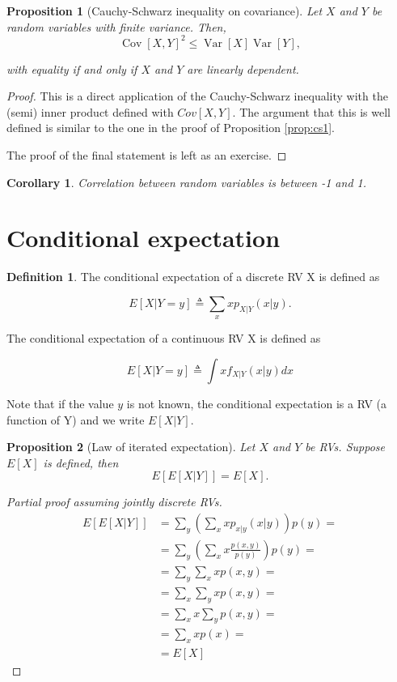 \documentclass{book}
\theoremstyle{plain}%
\newtheorem{corollary}{Corollary}[section]
\newtheorem{proposition}{Proposition}[section]
\theoremstyle{definition}
\newtheorem{definition}{Definition}[section]
\DeclareMathOperator{\Var}{Var}
\DeclareMathOperator{\Cov}{Cov}
\begin{document}
\begin{proposition}[Cauchy-Schwarz inequality on covariance]
Let $X$ and $Y$ be random variables with finite variance. Then,
$$\Cov[X,Y]^2 \leq \Var[X]\Var[Y],$$

with equality if and only if $X$ and $Y$ are linearly dependent.
\end{proposition}

\begin{proof}
This is a direct application of the Cauchy-Schwarz inequality with the (semi) inner product defined with $Cov[X,Y]$. The argument that this is well defined is similar to the one in the proof of Proposition \ref{prop:cs1}.

The proof of the final statement is left as an exercise.
\end{proof}

\begin{corollary}
Correlation between random variables is between -1 and 1.
\end{corollary}

\section{Conditional expectation}

\begin{definition}
The conditional expectation of a discrete RV X is defined as

$$E[X|Y = y] \triangleq \sum_x x p_{X|Y}(x|y).$$

The conditional expectation of a continuous RV X is defined as

$$E[X|Y = y] \triangleq \int x f_{X|Y}(x|y)dx$$
\end{definition}

Note that if the value $y$ is not known, the conditional expectation is a RV (a function of Y) and we write $E[X|Y]$.

\begin{proposition}[Law of iterated expectation] Let $X$ and $Y$ be RVs. Suppose $E[X]$ is defined, then
$$E[E[X|Y]] = E[X].$$
\end{proposition}

\begin{proof}[Partial proof assuming jointly discrete RVs] \begin{align*}
E[E[X|Y]] &= \sum_y \left(\sum_x x p_{x|y}(x|y)\right) p(y) =\\
 &= \sum_y \left(\sum_x x \frac{p(x,y)}{p(y)}\right) p(y) =\\
 &= \sum_y \sum_x x p(x,y) =\\
 &= \sum_x \sum_y x p(x,y) =\\
  &= \sum_x x \sum_y p(x,y) =\\
  &= \sum_x x p(x) =\\
  &= E[X]
\end{align*}
\end{proof}
\end{document}
